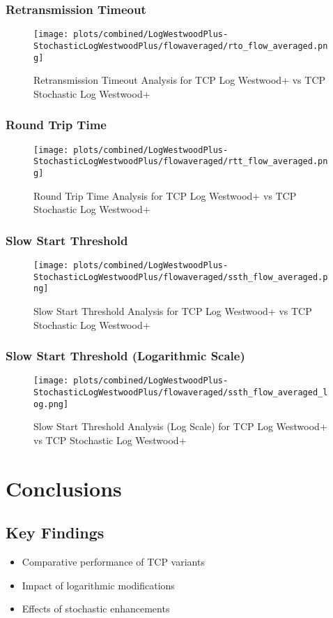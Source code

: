 \documentclass[12pt,a4paper]{report}
\begin{document}
\newpage

\newpage
\subsection{Retransmission Timeout}
\begin{figure}[H]
\centering
\texttt{[image: plots/combined/LogWestwoodPlus-StochasticLogWestwoodPlus/flowaveraged/rto\_flow\_averaged.png]}
\caption{Retransmission Timeout Analysis for TCP Log Westwood+ vs TCP Stochastic Log Westwood+}
\label{fig:LogWestwoodPlus-StochasticLogWestwoodPlus_rto}
\end{figure}

\newpage

\newpage
\subsection{Round Trip Time}
\begin{figure}[H]
\centering
\texttt{[image: plots/combined/LogWestwoodPlus-StochasticLogWestwoodPlus/flowaveraged/rtt\_flow\_averaged.png]}
\caption{Round Trip Time Analysis for TCP Log Westwood+ vs TCP Stochastic Log Westwood+}
\label{fig:LogWestwoodPlus-StochasticLogWestwoodPlus_rtt}
\end{figure}

\newpage

\newpage
\subsection{Slow Start Threshold}
\begin{figure}[H]
\centering
\texttt{[image: plots/combined/LogWestwoodPlus-StochasticLogWestwoodPlus/flowaveraged/ssth\_flow\_averaged.png]}
\caption{Slow Start Threshold Analysis for TCP Log Westwood+ vs TCP Stochastic Log Westwood+}
\label{fig:LogWestwoodPlus-StochasticLogWestwoodPlus_ssth}
\end{figure}

\newpage

\subsection{Slow Start Threshold (Logarithmic Scale)}
\begin{figure}[H]
\centering
\texttt{[image: plots/combined/LogWestwoodPlus-StochasticLogWestwoodPlus/flowaveraged/ssth\_flow\_averaged\_log.png]}
\caption{Slow Start Threshold Analysis (Log Scale) for TCP Log Westwood+ vs TCP Stochastic Log Westwood+}
\label{fig:LogWestwoodPlus-StochasticLogWestwoodPlus_ssth_log}
\end{figure}

\newpage

\chapter{Conclusions}
\section{Key Findings}
\begin{itemize}
\item Comparative performance of TCP variants
\item Impact of logarithmic modifications
\item Effects of stochastic enhancements
\end{itemize}
\end{document}
